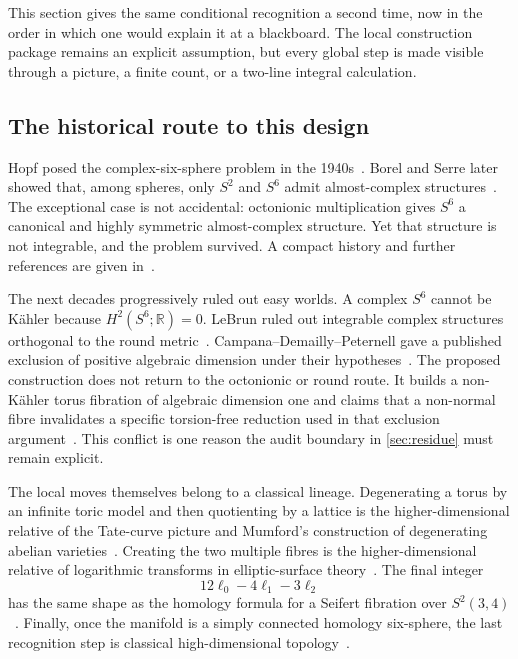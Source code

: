 \documentclass[11pt,reqno]{amsart}
\numberwithin{equation}{section}
\newcommand{\R}{\mathbb R}
\theoremstyle{definition}
\begin{document}
This section gives the same conditional recognition a second time, now in the order in which one would explain it at a blackboard. The local construction package remains an explicit assumption, but every global step is made visible through a picture, a finite count, or a two-line integral calculation.

\subsection{The historical route to this design}\label{sec:history-story}

Hopf posed the complex-six-sphere problem in the 1940s~\cite{Hopf}. Borel and Serre later showed that, among spheres, only $S^2$ and $S^6$ admit almost-complex structures~\cite{BorelSerre}. The exceptional case is not accidental: octonionic multiplication gives $S^6$ a canonical and highly symmetric almost-complex structure. Yet that structure is not integrable, and the problem survived. A compact history and further references are given in~\cite{Feng}.

The next decades progressively ruled out easy worlds. A complex $S^6$ cannot be K\"ahler because $H^2(S^6;\R)=0$. LeBrun ruled out integrable complex structures orthogonal to the round metric~\cite{LeBrun}. Campana--Demailly--Peternell gave a published exclusion of positive algebraic dimension under their hypotheses~\cite{CDP20}. The proposed construction does not return to the octonionic or round route. It builds a non-K\"ahler torus fibration of algebraic dimension one and claims that a non-normal fibre invalidates a specific torsion-free reduction used in that exclusion argument~\cite{S6,Feng}. This conflict is one reason the audit boundary in \cref{sec:residue} must remain explicit.

The local moves themselves belong to a classical lineage. Degenerating a torus by an infinite toric model and then quotienting by a lattice is the higher-dimensional relative of the Tate-curve picture and Mumford's construction of degenerating abelian varieties~\cite{BHPV,Mumford}. Creating the two multiple fibres is the higher-dimensional relative of logarithmic transforms in elliptic-surface theory~\cite{BHPV}. The final integer
\[
12\ell_0-4\ell_1-3\ell_2
\]
has the same shape as the homology formula for a Seifert fibration over $S^2(3,4)$~\cite{Orlik}. Finally, once the manifold is a simply connected homology six-sphere, the last recognition step is classical high-dimensional topology~\cite{Smale,KM}.
\end{document}
